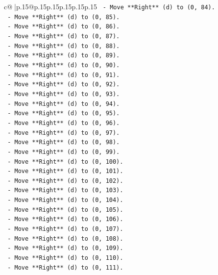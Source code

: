 \documentclass{article}
\begin{document}
{\begin{supertabular}{c@{$\;$}|p{.15\linewidth}@{}p{.15\linewidth}p{.15\linewidth}p{.15\linewidth}p{.15\linewidth}p{.15\linewidth}}
{{{\texttt{        {-} Move **Right** (d) to (0, 84).} \\
\texttt{        {-} Move **Right** (d) to (0, 85).} \\
\texttt{        {-} Move **Right** (d) to (0, 86).} \\
\texttt{        {-} Move **Right** (d) to (0, 87).} \\
\texttt{        {-} Move **Right** (d) to (0, 88).} \\
\texttt{        {-} Move **Right** (d) to (0, 89).} \\
\texttt{        {-} Move **Right** (d) to (0, 90).} \\
\texttt{        {-} Move **Right** (d) to (0, 91).} \\
\texttt{        {-} Move **Right** (d) to (0, 92).} \\
\texttt{        {-} Move **Right** (d) to (0, 93).} \\
\texttt{        {-} Move **Right** (d) to (0, 94).} \\
\texttt{        {-} Move **Right** (d) to (0, 95).} \\
\texttt{        {-} Move **Right** (d) to (0, 96).} \\
\texttt{        {-} Move **Right** (d) to (0, 97).} \\
\texttt{        {-} Move **Right** (d) to (0, 98).} \\
\texttt{        {-} Move **Right** (d) to (0, 99).} \\
\texttt{        {-} Move **Right** (d) to (0, 100).} \\
\texttt{        {-} Move **Right** (d) to (0, 101).} \\
\texttt{        {-} Move **Right** (d) to (0, 102).} \\
\texttt{        {-} Move **Right** (d) to (0, 103).} \\
\texttt{        {-} Move **Right** (d) to (0, 104).} \\
\texttt{        {-} Move **Right** (d) to (0, 105).} \\
\texttt{        {-} Move **Right** (d) to (0, 106).} \\
\texttt{        {-} Move **Right** (d) to (0, 107).} \\
\texttt{        {-} Move **Right** (d) to (0, 108).} \\
\texttt{        {-} Move **Right** (d) to (0, 109).} \\
\texttt{        {-} Move **Right** (d) to (0, 110).} \\
\texttt{        {-} Move **Right** (d) to (0, 111).} \\
}}}
\end{supertabular}}
\end{document}
